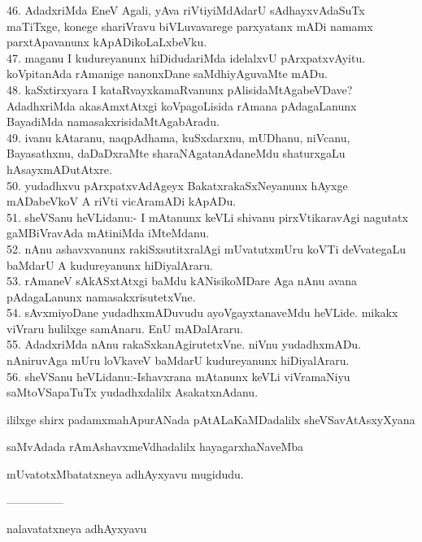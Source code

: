 \documentclass{article}
\begin{document}
46. AdadxriMda EneV Agali, yAva riVtiyiMdAdarU sAdhayxvAdaSuTx maTiTxge, konege shariVravu biVLuvavarege parxyatanx mADi namamx parxtApavanunx kApADikoLaLxbeVku.\\
47. maganu I kudureyanunx hiDidudariMda idelalxvU pArxpatxvAyitu. koVpitanAda rAmanige nanonxDane saMdhiyAguvaMte mADu.\\
48. kaSxtirxyara I kataRvayxkamaRvanunx pAlisidaMtAgabeVDave? AdadhxriMda akasAmxtAtxgi koVpagoLisida rAmana pAdagaLanunx BayadiMda namasakxrisidaMtAgabAradu.\\
49. ivanu kAtaranu, naqpAdhama, kuSxdarxnu, mUDhanu, niVcanu, Bayasathxnu, daDaDxraMte sharaNAgatanAdaneMdu shaturxgaLu hAsayxmADutAtxre.\\
50. yudadhxvu pArxpatxvAdAgeyx BakatxrakaSxNeyanunx hAyxge mADabeVkoV A riVti vicAramADi kApADu.\\
51. sheVSanu heVLidanu:- I mAtanunx keVLi shivanu pirxVtikaravAgi nagutatx gaMBiVravAda mAtiniMda iMteMdanu.\\
52. nAnu ashavxvanunx rakiSxsutitxralAgi mUvatutxmUru koVTi deVvategaLu baMdarU A kudureyanunx hiDiyalAraru.\\
53. rAmaneV sAkASxtAtxgi baMdu kANisikoMDare Aga nAnu avana pAdagaLanunx namasakxrisutetxVne.\\
54. sAvxmiyoDane yudadhxmADuvudu ayoVgayxtanaveMdu heVLide. mikakx viVraru hulilxge samAnaru. EnU mADalAraru.\\
55. AdadxriMda nAnu rakaSxkanAgirutetxVne. niVnu yudadhxmADu. nAniruvAga mUru loVkaveV baMdarU kudureyanunx hiDiyalAraru.\\
56. sheVSanu heVLidanu:-Ishavxrana mAtanunx keVLi viVramaNiyu saMtoVSapaTuTx yudadhxdalilx AsakatxnAdanu.

\begin{center}
ililxge shirx padamxmahApurANada pAtALaKaMDadalilx sheVSavAtAsxyXyana
\end{center}

\begin{center}
saMvAdada rAmAshavxmeVdhadalilx hayagarxhaNaveMba
\end{center}

\begin{center}
mUvatotxMbatatxneya adhAyxyavu mugidudu.
\end{center}

\begin{center}
---------------
\end{center}

\begin{center}
nalavatatxneya adhAyxyavu
\end{center}
\end{document}
